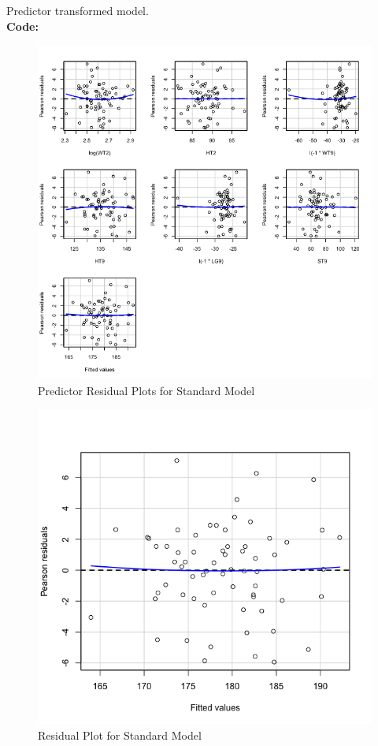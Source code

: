 \documentclass[12pt]{article}
\makeatletter
\theoremstyle{homework}
\newenvironment{exercise}[1]
{\def\@currentlabel{#1}\exercisecore}
{\endexercisecore}
\makeatother
\begin{document}
\begin{exercise}{10.4}
\begin{figure}[H]
\begin{center}
    \end{center}
  \end{figure}
  Predictor transformed model.\\
  \textbf{Code:}
  \begin{center}
  
  \end{center} 
  \begin{figure}[H]
    \begin{center}
    \caption{Predictor Residual Plots for Standard Model}
    \includegraphics[width = \textwidth]{ResidualsPredTransformed.png}
    \end{center}
  \end{figure}
  \begin{figure}[H]
    \begin{center}
    \caption{Residual Plot for Standard Model}
    \includegraphics[width = \textwidth]{ResidualPlotPredTrans.png}

\end{center}
\end{figure}
\end{exercise}
\end{document}
